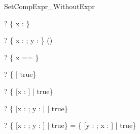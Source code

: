 \begin{zsection}
  \SECTION SetCompExpr\_WithoutExpr
\end{zsection}

\begin{zed}
  \vdash? \{ x : \nat \} \in \power\nat
\end{zed}

\begin{zed}
  \vdash? \{ x : \nat; y : \power \nat \} 
               \in \power (\nat \cross \power\nat)
\end{zed}

\begin{zed}
  \vdash? \{ x == \nat \} \in \power\power\nat
\end{zed}

\begin{zed}
  \vdash? \{ | true\} \in \power [|true]
\end{zed}

\begin{zed}
  \vdash? \{ [x : \nat] | true\} \in \power [x : \nat] 
\end{zed}

\begin{zed}
  \vdash? \{ [x : \nat; y : \power\nat] | true\} 
               \in {} 
\end{zed}

\begin{zed}
  \vdash? \{ [x : \nat; y : \power\nat] | true\} =
          \{ [y : \power\nat; x : \nat] | true\}
\end{zed}
